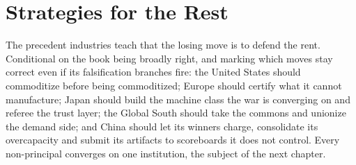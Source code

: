 \chapter{Strategies for the Rest}
\label{c:strategies}

\begin{glance}
The precedent industries teach that the losing move is to defend the rent. Conditional on the book being broadly right, and marking which moves stay correct even if its falsification branches fire: the United States should commoditize before being commoditized; Europe should certify what it cannot manufacture; Japan should build the machine class the war is converging on and referee the trust layer; the Global South should take the commons and unionize the demand side; and China should let its winners charge, consolidate its overcapacity and submit its artifacts to scoreboards it does not control. Every non-principal converges on one institution, the subject of the next chapter.
\end{glance}


